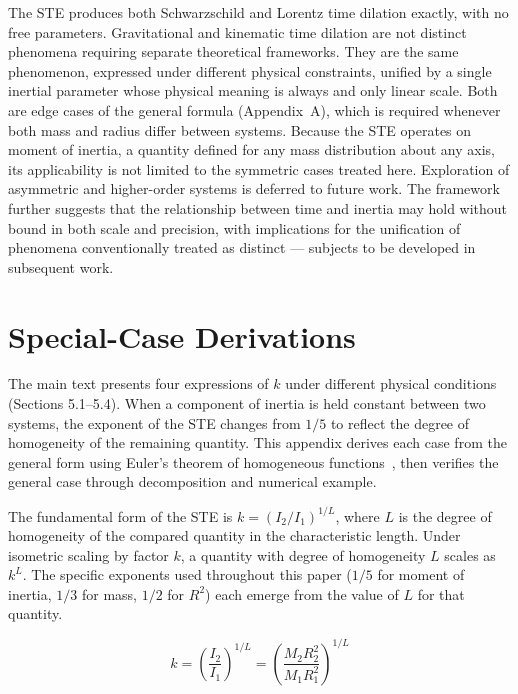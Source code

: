 \documentclass[a4paper,11pt]{article}
\begin{document}
The STE produces both Schwarzschild and Lorentz time dilation exactly, with no free parameters. Gravitational and kinematic time dilation are not distinct phenomena requiring separate theoretical frameworks. They are the same phenomenon, expressed under different physical constraints, unified by a single inertial parameter whose physical meaning is always and only linear scale. Both are edge cases of the general formula (Appendix~A), which is required whenever both mass and radius differ between systems. Because the STE operates on moment of inertia, a quantity defined for any mass distribution about any axis, its applicability is not limited to the symmetric cases treated here. Exploration of asymmetric and higher-order systems is deferred to future work. The framework further suggests that the relationship between time and inertia may hold without bound in both scale and precision, with implications for the unification of phenomena conventionally treated as distinct --- subjects to be developed in subsequent work.

\appendix
\renewcommand{\thesection}{Appendix~\Alph{section}}
\section{Special-Case Derivations} \label{app:general_ste}

The main text presents four expressions of $k$ under different physical conditions (Sections 5.1--5.4). When a component of inertia is held constant between two systems, the exponent of the STE changes from $1/5$ to reflect the degree of homogeneity of the remaining quantity. This appendix derives each case from the general form using Euler's theorem of homogeneous functions~\cite{euler1755}, then verifies the general case through decomposition and numerical example.

The fundamental form of the STE is $k = (I_2/I_1)^{1/L}$, where $L$ is the degree of homogeneity of the compared quantity in the characteristic length. Under isometric scaling by factor $k$, a quantity with degree of homogeneity $L$ scales as $k^L$. The specific exponents used throughout this paper ($1/5$ for moment of inertia, $1/3$ for mass, $1/2$ for $R^2$) each emerge from the value of $L$ for that quantity.

\begin{equation}
k = \left(\frac{I_2}{I_1}\right)^{1/L} = \left(\frac{M_2 R_2^2}{M_1 R_1^2}\right)^{1/L}
\end{equation}
\end{document}
